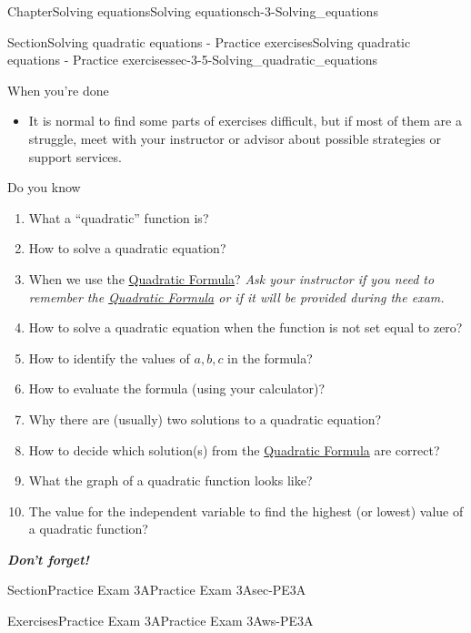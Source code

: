 \documentclass[twoside,11pt,]{book}
\newcommand{\alert}[1]{\textbf{\textit{#1}}}
\numberwithin{equation}{section}
\begin{document}
\begin{chapterptx}{Chapter}{Solving equations}{}{Solving equations}{}{}{ch-3-Solving_equations}
\begin{sectionptx}{Section}{Solving quadratic equations - Practice exercises}{}{Solving quadratic equations - Practice exercises}{}{}{sec-3-5-Solving_quadratic_equations}
\begin{conclusion}{When you're done \textellipsis{}}
\begin{itemize}[label=\textbullet]
\item{}It is normal to find some parts of exercises difficult, but if most of them are a struggle, meet with your instructor or advisor about possible strategies or support services.%
\end{itemize}
%
\end{conclusion}%
\begin{conclusion}{Do you know \textellipsis{}}%
%
\begin{enumerate}[label={\Alph*.}]
\item{}What a ``quadratic'' function is?%
\item{}How to solve a quadratic equation?%
\item{}When we use the \hyperref[quadratic-formula]{Quadratic Formula}? \emph{Ask your instructor if you need to remember the \hyperref[quadratic-formula]{Quadratic Formula} or if it will be provided during the exam.}%
\item{}How to solve a quadratic equation when the function is not set equal to zero?%
\item{}How to identify the values of \(a, b, c\) in the formula?%
\item{}How to evaluate the formula (using your calculator)?%
\item{}Why there are (usually) two solutions to a quadratic equation?%
\item{}How to decide which solution(s) from the \hyperref[quadratic-formula]{Quadratic Formula} are correct?%
\item{}What the graph of a quadratic function looks like?%
\item{}The value for the independent variable to find the highest (or lowest) value of a quadratic function?%
\end{enumerate}
%
\par
\alert{Don't forget!}%
\end{conclusion}%
\end{sectionptx}
%
%
\typeout{************************************************}
\typeout{************************************************}
%
\begin{sectionptx}{Section}{Practice Exam 3A}{}{Practice Exam 3A}{}{}{sec-PE3A}
%
%
\typeout{************************************************}
\typeout{************************************************}
%
\begin{exercises-subsection-numberless}{Exercises}{Practice Exam 3A}{}{Practice Exam 3A}{}{}{ws-PE3A}

\end{exercises-subsection-numberless}
\end{sectionptx}
\end{chapterptx}
\end{document}
